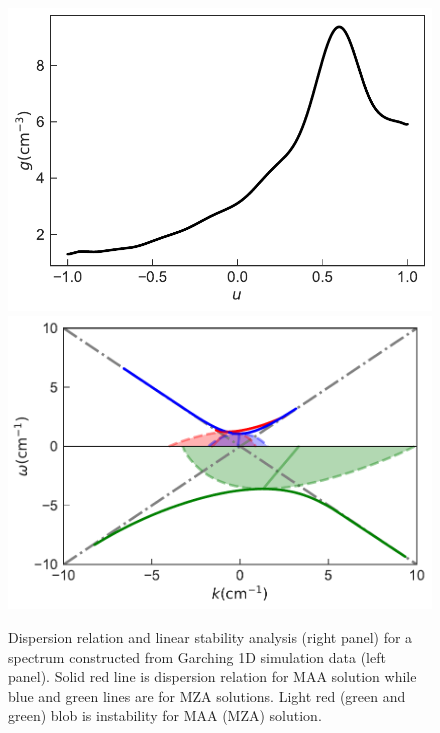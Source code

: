 \begin{figure}
     \includegraphics[width=\linewidth]{chapters/assets/dr/spectGarchingPlt.pdf}
   \endminipage\hfill
   \includegraphics[width=\linewidth]{chapters/assets/dr/spectGarchingDRLSAPltBlob.pdf}
   \endminipage\hfill
   \caption{Dispersion relation and linear stability analysis (right panel) for a spectrum constructed from Garching 1D simulation data (left panel). Solid red line is dispersion relation for MAA solution while blue and green lines are for MZA solutions. Light red (green and green) blob is instability for MAA (MZA) solution.
    }
   \label{fig-garching}
\end{figure}






